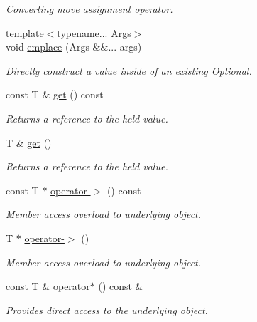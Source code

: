 \begin{DoxyCompactItemize}
\begin{DoxyCompactList}\small\item\em Converting move assignment operator. \end{DoxyCompactList}\item 
{\footnotesize template$<$typename... Args$>$ }\\void \hyperlink{classmcurses_1_1Optional_ad61d5e9b20d4824e064f528772e9b805}{emplace} (Args \&\&... args)
\begin{DoxyCompactList}\small\item\em Directly construct a value inside of an existing \hyperlink{classmcurses_1_1Optional}{Optional}. \end{DoxyCompactList}\item 
const T \& \hyperlink{classmcurses_1_1Optional_ac85ab4b82668d46e40f0ad02b83d047e}{get} () const
\begin{DoxyCompactList}\small\item\em Returns a reference to the held value. \end{DoxyCompactList}\item 
T \& \hyperlink{classmcurses_1_1Optional_a353d8df8a75234d372b3a0b0027f2afd}{get} ()
\begin{DoxyCompactList}\small\item\em Returns a reference to the held value. \end{DoxyCompactList}\item 
const T $\ast$ \hyperlink{classmcurses_1_1Optional_a4b2038d37bb6a17cac2904d7c82ce156}{operator-\/$>$} () const
\begin{DoxyCompactList}\small\item\em Member access overload to underlying object. \end{DoxyCompactList}\item 
T $\ast$ \hyperlink{classmcurses_1_1Optional_a64ff247dad4e237f9e16c073174ba6be}{operator-\/$>$} ()
\begin{DoxyCompactList}\small\item\em Member access overload to underlying object. \end{DoxyCompactList}\item 
const T \& \hyperlink{classmcurses_1_1Optional_a080bc167c71a50bdbe27944c2e9b6019}{operator$\ast$} () const \&
\begin{DoxyCompactList}\small\item\em Provides direct access to the underlying object. \end{DoxyCompactList}\item 

\end{DoxyCompactItemize}
